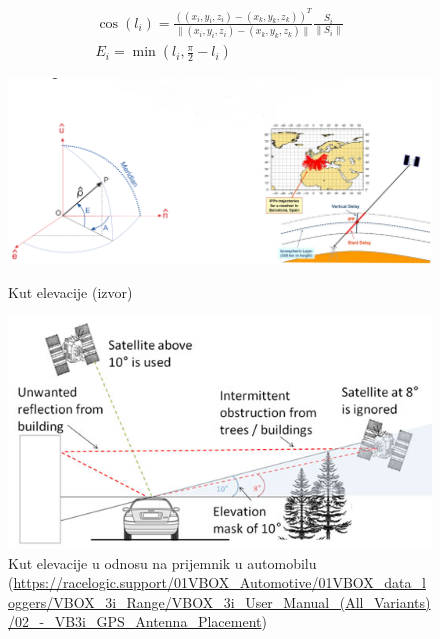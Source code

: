 \documentclass[a4paper,twoside,12pt]{memoir} %
\begin{document}
\begin{align}\label{eq:elevation}
	\cos (l_i) = \frac{((x_i,y_i,z_i)-(x_k,y_k,z_k))^T}{\| (x_i,y_i,z_i)-(x_k,y_k,z_k) \|} \frac{S_i}{\| S_i \|} \\
	E_i = \min(l_i, \frac{\pi}{2}-l_i)
\end{align}\cite{elevation_angle}

\begin{figure}[H]
	\begin{minipage}{0.9\textwidth}
		\centering
		\includegraphics[width=1\textwidth]{elev}
		\caption{Kut elevacije (izvor)}
		\label{fig:elev}
	\end{minipage}
	\begin{minipage}{0.9\textwidth}
		\centering
		\includegraphics[width=1\textwidth]{elevBetter}
		\caption{Kut elevacije u odnosu na prijemnik u automobilu (\url{https://racelogic.support/01VBOX_Automotive/01VBOX_data_loggers/VBOX_3i_Range/VBOX_3i_User_Manual_(All_Variants)/02_-_VB3i_GPS_Antenna_Placement})}
		\label{fig:elevBetter}
	\end{minipage}
\end{figure}%
\end{document}

